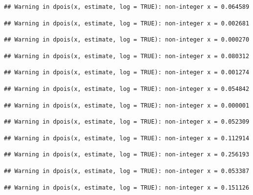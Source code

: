 \documentclass[]{article}
\begin{document}
\begin{verbatim}
## Warning in dpois(x, estimate, log = TRUE): non-integer x = 0.064589
\end{verbatim}

\begin{verbatim}
## Warning in dpois(x, estimate, log = TRUE): non-integer x = 0.002681
\end{verbatim}

\begin{verbatim}
## Warning in dpois(x, estimate, log = TRUE): non-integer x = 0.000270
\end{verbatim}

\begin{verbatim}
## Warning in dpois(x, estimate, log = TRUE): non-integer x = 0.080312
\end{verbatim}

\begin{verbatim}
## Warning in dpois(x, estimate, log = TRUE): non-integer x = 0.001274
\end{verbatim}

\begin{verbatim}
## Warning in dpois(x, estimate, log = TRUE): non-integer x = 0.054842
\end{verbatim}

\begin{verbatim}
## Warning in dpois(x, estimate, log = TRUE): non-integer x = 0.000001
\end{verbatim}

\begin{verbatim}
## Warning in dpois(x, estimate, log = TRUE): non-integer x = 0.052309
\end{verbatim}

\begin{verbatim}
## Warning in dpois(x, estimate, log = TRUE): non-integer x = 0.112914
\end{verbatim}

\begin{verbatim}
## Warning in dpois(x, estimate, log = TRUE): non-integer x = 0.256193
\end{verbatim}

\begin{verbatim}
## Warning in dpois(x, estimate, log = TRUE): non-integer x = 0.053387
\end{verbatim}

\begin{verbatim}
## Warning in dpois(x, estimate, log = TRUE): non-integer x = 0.151126
\end{verbatim}
\end{document}
